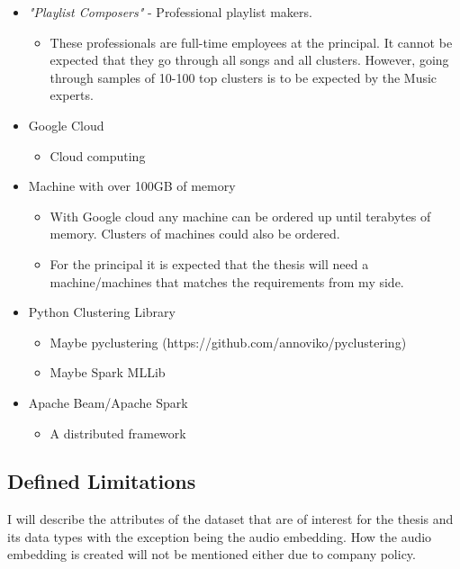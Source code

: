 \documentclass[a4paper,11pt]{article}
\begin{document}
\begin{itemize}
\item
  \textit{"Playlist Composers"} - Professional playlist makers.

  \begin{itemize}

  \item
    These professionals are full-time employees at the principal. It
    cannot be expected that they go through all songs and all clusters.
    However, going through samples of 10-100 top clusters is to be
    expected by the Music experts.
  \end{itemize}
\item
  Google Cloud
  \begin{itemize}
    \item Cloud computing
  \end{itemize}
\item
  Machine with over 100GB of memory

  \begin{itemize}
  \item
    With Google cloud any machine can be ordered up until terabytes of
    memory. Clusters of machines could also be ordered.
  \item
    For the principal it is expected that the thesis will need a
    machine/machines that matches the requirements from my side.
  \end{itemize}
\item
  Python Clustering Library

  \begin{itemize}
  \item
    Maybe pyclustering (https://github.com/annoviko/pyclustering)
  \item
    Maybe Spark MLLib
  \end{itemize}
\item
  Apache Beam/Apache Spark

  \begin{itemize}
  \item
    A distributed framework
  \end{itemize}
\end{itemize}

\subsection{Defined Limitations}

I will describe the attributes of the dataset that are of interest for
the thesis and its data types with the exception being the audio
embedding. How the audio embedding is created will not be mentioned
either due to company policy.
\end{document}
